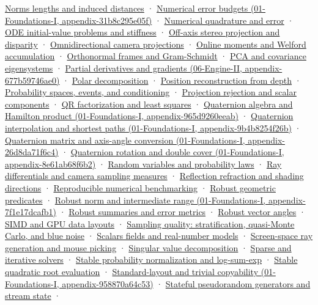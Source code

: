 \hyperref[appendix-49933872bb51]{Norms lengths and induced distances} · \href{../01-Foundations-I/main.pdf\#nameddest=appendix-31b8c295e05f}{Numerical error budgets (01-Foundations-I, appendix-31b8c295e05f)} · \hyperref[appendix-80521eae6b71]{Numerical quadrature and error} · \hyperref[appendix-e8ab9836882e]{ODE initial-value problems and stiffness} · \hyperref[appendix-0976e86e5b9f]{Off-axis stereo projection and disparity} · \hyperref[appendix-fc99ad39f351]{Omnidirectional camera projections} · \hyperref[appendix-33237f0f618b]{Online moments and Welford accumulation} · \hyperref[appendix-c39f1ed34271]{Orthonormal frames and Gram-Schmidt} · \hyperref[appendix-ad175ef3c5bf]{PCA and covariance eigensystems} · \href{../06-Engine-II/main.pdf\#nameddest=appendix-677b59746ae0}{Partial derivatives and gradients (06-Engine-II, appendix-677b59746ae0)} · \hyperref[appendix-73f5bcf7a462]{Polar decomposition} · \hyperref[appendix-2cbf2968e866]{Position reconstruction from depth} · \hyperref[appendix-f1ef323f6ed7]{Probability spaces, events, and conditioning} · \hyperref[appendix-505a502c372a]{Projection rejection and scalar components} · \hyperref[appendix-c3421e6b4f2c]{QR factorization and least squares} · \href{../01-Foundations-I/main.pdf\#nameddest=appendix-965d9260eeab}{Quaternion algebra and Hamilton product (01-Foundations-I, appendix-965d9260eeab)} · \href{../01-Foundations-I/main.pdf\#nameddest=appendix-9b4b8254f26b}{Quaternion interpolation and shortest paths (01-Foundations-I, appendix-9b4b8254f26b)} · \href{../01-Foundations-I/main.pdf\#nameddest=appendix-26d8da71f6c4}{Quaternion matrix and axis-angle conversion (01-Foundations-I, appendix-26d8da71f6c4)} · \href{../01-Foundations-I/main.pdf\#nameddest=appendix-8e61ab68f6b2}{Quaternion rotation and double cover (01-Foundations-I, appendix-8e61ab68f6b2)} · \hyperref[appendix-4d0203f7944f]{Random variables and probability laws} · \hyperref[appendix-8c40fad29462]{Ray differentials and camera sampling measures} · \hyperref[appendix-44e00863b4d5]{Reflection refraction and shading directions} · \hyperref[appendix-b9db93e28371]{Reproducible numerical benchmarking} · \hyperref[appendix-341296fb3f64]{Robust geometric predicates} · \href{../01-Foundations-I/main.pdf\#nameddest=appendix-7f1e17dcafb1}{Robust norm and intermediate range (01-Foundations-I, appendix-7f1e17dcafb1)} · \hyperref[appendix-bcc44e9d3d02]{Robust summaries and error metrics} · \hyperref[appendix-e569e60e18e6]{Robust vector angles} · \hyperref[appendix-3c7b1a56de01]{SIMD and GPU data layouts} · \hyperref[appendix-9f693ffd82bc]{Sampling quality: stratification, quasi-Monte Carlo, and blue noise} · \hyperref[appendix-52051ad550fe]{Scalars fields and real-number models} · \hyperref[appendix-f1a6d43e80d1]{Screen-space ray generation and mouse picking} · \hyperref[appendix-1fad5e7f36fa]{Singular value decomposition} · \hyperref[appendix-67c87a3d9e94]{Sparse and iterative solvers} · \hyperref[appendix-d580b422240f]{Stable probability normalization and log-sum-exp} · \hyperref[appendix-b9afba7f63e5]{Stable quadratic root evaluation} · \href{../01-Foundations-I/main.pdf\#nameddest=appendix-958870a64c53}{Standard-layout and trivial copyability (01-Foundations-I, appendix-958870a64c53)} · \hyperref[appendix-e0f7c7e08f3a]{Stateful pseudorandom generators and stream state} · 